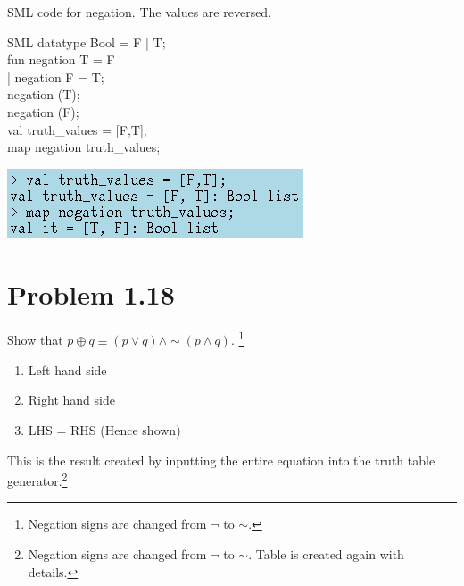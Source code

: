 \documentclass[11pt]{article}
\begin{document}
SML code for negation. The values are reversed.\\
\begin{GFT}{SML}
\+datatype Bool = F | T;\\
\+fun negation T = F\\
\+ | negation F = T;\\
\+negation (T);\\
\+negation (F);\\
\+val truth\_values = [F,T];\\
\+map negation truth\_values;\\
\end{GFT}
\includegraphics[scale=0.6]{neg.png}\\
\noindent{ \color{red} \rule{\linewidth} {0.5mm} }
\clearpage

\clearpage

\section*{Problem 1.18}
Show that $p \oplus q \equiv (p \lor q) \land \sim (p \land q)$. \footnote{Negation signs are changed from $\neg$ to $\sim$.}\\
\begin{enumerate}
\item 
Left hand side 
 

\item
Right hand side 
 

\item
LHS = RHS (Hence shown)
\end{enumerate} 
\clearpage

This is the result created by inputting the entire equation into the truth table generator.\footnote{Negation signs are changed from $\neg$ to $\sim$. Table is created again with details.}

\end{document}
